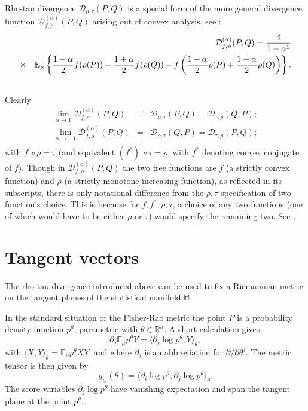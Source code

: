 \documentclass[graybox]{svmult}
\newcommand{\be}{\begin{equation}}
\newcommand{\ee}{\end{equation}}
\newcommand{\beq}{\begin{eqnarray}}
\newcommand{\eeq}{\end{eqnarray}}
\newcommand{\Mo}{\mathbb M}
\newcommand{\Eo}{\mathbb E}
\newcommand{\Ro}{\mathbb R}
\newcommand{\Ddiv}{\mathcal{D}}
\begin{document}
Rho-tau divergence $\Ddiv _{\rho,\tau}(P,Q)$ is a special form of the more general divergence function
$\Ddiv^{(\alpha)}_{f, \rho}(P,Q)$ arising out of convex analysis, see \cite{zhang2004a, zhang2005}:
\beq
\label{alpha_div}
& &\Ddiv^{(\alpha)}_{f, \rho}(P,Q) 
= \frac{4}{1-\alpha^{2}} \cr
&\times&
\Eo_\mu \left\{
 \frac{1-\alpha}{2} f(\rho(P)) + \frac{1+\alpha}{2}
f(\rho(Q)) -  f \left( \frac{1-\alpha}{2}
\rho(P)+\frac{1+\alpha}{2} \rho(Q) \right) \right\} .\cr
& &
\eeq
Clearly
\begin{eqnarray*}
 \lim_{\alpha \rightarrow 1}  \Ddiv^{(\alpha)}_{f, \rho}(P,Q) &=& 
 \Ddiv_{\rho,\tau}(P,Q) = \Ddiv_{\tau,\rho}(Q,P); \\
 \lim_{\alpha \rightarrow -1}  \Ddiv^{(\alpha)}_{f, \rho}(P,Q) &=& 
 \Ddiv_{\rho,\tau}(Q,P) = \Ddiv_{\tau,\rho}(P,Q); 
\end{eqnarray*}
with $f^\prime \circ \rho = \tau$ 
(and equivalent $(f^\ast)^\prime \circ \tau = \rho$, with $f^\ast$ denoting convex conjugate of $f$).  
Though in $\Ddiv^{(\alpha)}_{f, \rho}(P,Q)$ the two free functions are $f$ 
(a strictly convex function) and $\rho$ (a strictly monotone increasing function), as reflected in its subscripts,
there is only notational difference from the $\rho, \tau$ specification of two function's choice. 
This is because for $f, f^\ast, \rho, \tau$, a choice of any two functions 
(one of which would have to be either $\rho$ or $\tau$) would specify the remaining two. See \cite{zhang2004a,zhang15}. 


\section{Tangent vectors}
\label{sect:tangent}

The rho-tau divergence introduced above can be used to fix a Riemannian metric on the tangent planes
of the statistical manifold $\Mo$.

In the standard situation of the Fisher-Rao metric the point $P$ is a probability density function $p^\theta$,
parametric with $\theta\in\Ro^n$. A short calculation gives
\be
\partial_j\Eo_\mu p^\theta Y=\big\langle\partial_j \log p^\theta,Y\big\rangle_\theta,
\label{tangent:fr}
\ee
with $\langle X,Y\rangle_\theta=\Eo_\mu p^\theta XY$,
and where  $\partial_j$ is an abbreviation for $\partial/\partial\theta^j$.
The metric tensor is then given by 
\be
g_{ij}(\theta)
=
\langle \partial_i \log p^\theta,\partial_j \log p^\theta\rangle_\theta.
\nonumber
\ee
The score variables $\partial_j \log p^\theta$ have vanishing expectation and span the tangent plane
at the point $p^\theta$.
\end{document}
